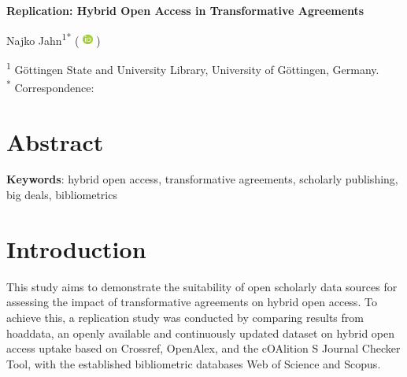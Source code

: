 \documentclass[a4paper,man,floatsintext,longtable,noextraspace,10pt]{apa6}
\begin{document}
\thispagestyle{otherpage}


\begin{large}
\textbf{Replication: Hybrid Open Access in Transformative Agreements}
\end{large}

\newcommand{\orcid}{%
  \begingroup\normalfont
  \includegraphics[height=0.9em]{orcid_logo}%
  \endgroup
}

Najko Jahn\textsuperscript{1}\textsuperscript{*} 
(\orcid{} \href{https://orcid.org/0000-0001-5105-1463}{\color{black}{0000-0001-5105-1463}})

\textsuperscript{1} Göttingen State and University Library, University of Göttingen, Germany. \\

\textsuperscript{*} Correspondence: \href{mailto:najko.jahn@sub.uni-goettingen.de}{\color{black}{najko.jahn@sub.uni-goettingen.de}} 

\section*{Abstract}
{}
{\textbf{Keywords}: hybrid open access, transformative agreements, scholarly publishing, big deals, bibliometrics}

\newpage

\setcounter{secnumdepth}{2}

\section{Introduction}\label{introduction}

This study aims to demonstrate the suitability of open scholarly data
sources for assessing the impact of transformative agreements on hybrid
open access. To achieve this, a replication study was conducted by
comparing results from hoaddata, an openly available and continuously
updated dataset on hybrid open access uptake based on Crossref,
OpenAlex, and the cOAlition S Journal Checker Tool, with the established
bibliometric databases Web of Science and Scopus.
\end{document}
